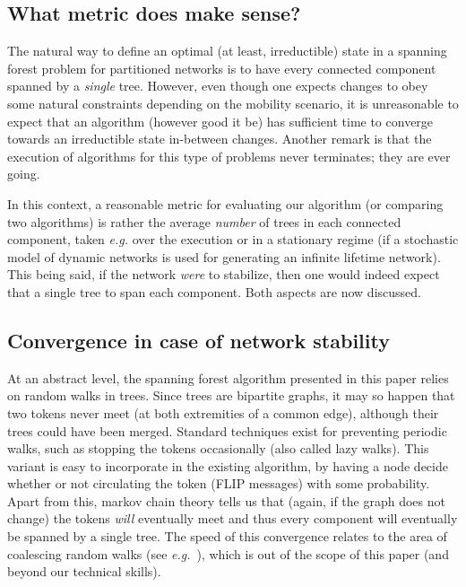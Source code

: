 \documentclass[twocolumn]{article}
\begin{document}
\subsection{What metric does make sense?}
\label{sec:metric}

The natural way to define an optimal (at least, irreductible) state in a spanning forest problem for partitioned networks is to have every connected component spanned by a {\em single} tree. However, even though 
one expects changes to obey some natural constraints depending on the mobility scenario, it is unreasonable to expect that an algorithm (however good it be) has sufficient time to converge towards an irreductible state in-between changes. Another remark is that the execution of algorithms for this type of problems never terminates; they are ever going.

In this context, a reasonable metric for evaluating our algorithm (or comparing two algorithms) is rather the average {\em number} of trees in each connected component, taken {\it e.g.} over the execution or in a stationary regime (if a stochastic model of dynamic networks is used for generating an infinite lifetime network). This being said, if the network {\em were} to stabilize, then one would indeed expect that a single tree to span each component. Both aspects are now discussed.


\subsection{Convergence in case of network stability} At an abstract level, the spanning forest algorithm presented in this paper relies on random walks in trees. Since trees are bipartite graphs, it may so happen that two tokens never meet (at both extremities of a common edge), although their trees could have been merged. 
Standard techniques exist for preventing periodic walks, such as stopping the tokens occasionally (also called lazy walks). This variant is easy to incorporate in the existing algorithm, by having a node decide whether or not circulating the token (FLIP messages) with some probability. Apart from this, markov chain theory tells us that (again, if the graph does not change) the tokens {\em will} eventually meet and thus every component will eventually be spanned by a single tree. The speed of this convergence relates to the area of coalescing random walks (see {\it e.g.}~\cite{Cooper13}), which is out of the scope of this paper (and beyond our technical skills).
\end{document}
